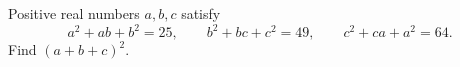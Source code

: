 Positive real numbers $a,b,c$ satisfy
\[a^2+ab+b^2=25,\qquad b^2+bc+c^2=49,\qquad c^2+ca+a^2=64.\]
Find $(a+b+c)^2$.
